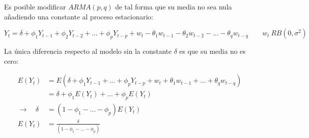 \documentclass[a4paper,10pt]{article}
\begin{document}
Es posible modificar $ARMA(p,q)$ de tal forma que su media no sea nula añadiendo una constante al proceso estacionario:

\begin{equation}
Y_t = \delta + \phi_1Y_{t-1} + \phi_2Y_{t-2} + ... + \phi_pY_{t-p} + w_t -\theta_1w_{t-1} - \theta_2w_{t-2} - ... - \theta_qw_{t-q} \qquad w_t ~ RB(0,\sigma^2)
\end{equation}

La única diferencia respecto al modelo sin la constante $\delta$ es que su media no es cero:

\begin{equation*}
\begin{split}
E(Y_t) &= E(\delta + \phi_1 Y_{t-1} +...+ \phi_p Y_{t-p} + w_t + \theta_1 w_{t-1} + ... + \theta_q w_{t-q})\\
& = \delta + \phi_1 E(Y_t) + ... + \phi_p E(Y_{t})\\
\to \quad \delta &= (1-\phi_1-...-\phi_p) E(Y_t) \\
E(Y_t) & = \frac{\delta}{(1-\phi_1-...-\phi_p)}
\end{split}
\end{equation*}
\end{document}
